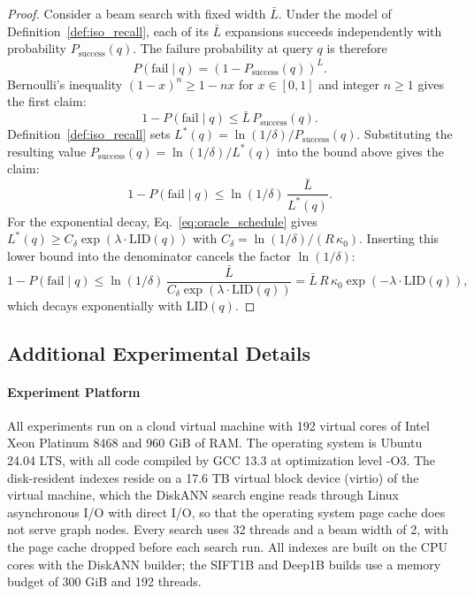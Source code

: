 \documentclass{article}
\theoremstyle{plain}
\theoremstyle{definition}
\theoremstyle{remark}
\begin{document}
\begin{proof}
Consider a beam search with fixed width $\bar{L}$. Under the model of Definition~\ref{def:iso_recall}, each of its $\bar{L}$ expansions succeeds independently with probability $P_{\mathrm{success}}(q)$. The failure probability at query $q$ is therefore
\begin{equation}
    P(\mathrm{fail} \mid q) = \left(1 - P_{\mathrm{success}}(q)\right)^{\bar{L}}.
\end{equation}
Bernoulli's inequality $(1-x)^{n} \ge 1 - n x$ for $x \in [0, 1]$ and integer $n \ge 1$ gives the first claim:
\begin{equation}
    1 - P(\mathrm{fail} \mid q) \le \bar{L}\, P_{\mathrm{success}}(q).
\end{equation}
Definition~\ref{def:iso_recall} sets $L^*(q) = \ln(1/\delta)/P_{\mathrm{success}}(q)$. Substituting the resulting value $P_{\mathrm{success}}(q) = \ln(1/\delta)/L^*(q)$ into the bound above gives the claim:
\begin{equation}
    1 - P(\mathrm{fail} \mid q) \le \ln(1/\delta)\, \frac{\bar{L}}{L^*(q)}.
\end{equation}
For the exponential decay, Eq.~\eqref{eq:oracle_schedule} gives $L^*(q) \ge C_\delta \exp(\lambda \cdot \mathrm{LID}(q))$ with $C_\delta = \ln(1/\delta)/(R\, \kappa_0)$. Inserting this lower bound into the denominator cancels the factor $\ln(1/\delta)$:
\begin{equation}
    1 - P(\mathrm{fail} \mid q) \le \ln(1/\delta)\, \frac{\bar{L}}{C_\delta \exp(\lambda \cdot \mathrm{LID}(q))} = \bar{L}\, R\, \kappa_0 \exp\!\left(-\lambda \cdot \mathrm{LID}(q)\right),
    \label{eq:recall_gap}
\end{equation}
which decays exponentially with $\mathrm{LID}(q)$.
\end{proof}



\subsection{Additional Experimental Details}
\label{appendix:setup}

\paragraph{Experiment Platform}
All experiments run on a cloud virtual machine with 192 virtual cores of Intel Xeon Platinum 8468 and 960 GiB of RAM. The operating system is Ubuntu 24.04 LTS, with all code compiled by GCC 13.3 at optimization level -O3. The disk-resident indexes reside on a 17.6 TB virtual block device (virtio) of the virtual machine, which the DiskANN search engine reads through Linux asynchronous I/O with direct I/O, so that the operating system page cache does not serve graph nodes. Every search uses 32 threads and a beam width of 2, with the page cache dropped before each search run. All indexes are built on the CPU cores with the DiskANN builder; the SIFT1B and Deep1B builds use a memory budget of 300 GiB and 192 threads.
\end{document}
